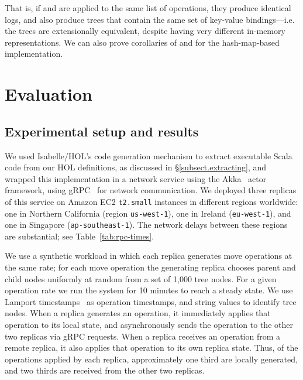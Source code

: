 \documentclass[sigplan,anonymous]{acmart}
\begin{document}
That is, if  and  are applied to the same list of operations, they produce identical logs, and also produce trees that contain the same set of key-value bindings---i.e. the trees are extensionally equivalent, despite having very different in-memory representations.
We can also prove corollaries of  and  for the hash-map-based implementation.

\section{Evaluation}\label{sec:evaluation}

\subsection{Experimental setup and results}

We used Isabelle/HOL's code generation mechanism to extract executable Scala code from our HOL definitions, as discussed in \S\ref{subsect.extracting}, and wrapped this implementation in a network service using the Akka~\cite{Akka} actor framework, using gRPC~\cite{gRPC} for network communication.
We deployed three replicas of this service on Amazon EC2 \texttt{t2.small} instances in different regions worldwide: one in Northern California (region \texttt{us-west-1}), one in Ireland (\texttt{eu-west-1}), and one in Singapore (\texttt{ap-southeast-1}).
The network delays between these regions are substantial; see Table~\ref{tab:rpc-times}.

We use a synthetic workload in which each replica generates move operations at the same rate; for each move operation the generating replica chooses parent and child nodes uniformly at random from a set of 1,000 tree nodes.
For a given operation rate we run the system for 10 minutes to reach a steady state.
We use Lamport timestamps~\cite{Lamport:1978jq} as operation timestamps, and string values to identify tree nodes.
When a replica generates an operation, it immediately applies that operation to its local state, and asynchronously sends the operation to the other two replicas via gRPC requests.
When a replica receives an operation from a remote replica, it also applies that operation to its own replica state.
Thus, of the operations applied by each replica, approximately one third are locally generated, and two thirds are received from the other two replicas.
\end{document}
